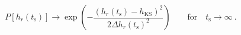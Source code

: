 \begin{equation}
P[h_r(t_\mathrm{s})] \rightarrow 
\exp\left( - \frac{ (h_r(t_\mathrm{s}) - h_\mathrm{KS})^2 }
{ 2 \Delta h_r(t_\mathrm{s})^2 } \right) \qquad
\mathrm{for}\quad t_\mathrm{s}\rightarrow\infty\ .
\label{eq29}
\end{equation}

